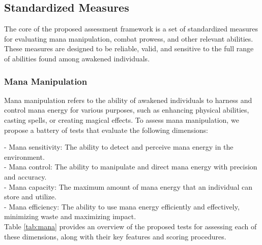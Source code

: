\documentclass[12pt, a4paper]{article}
\begin{document}
\subsection{Standardized Measures}

The core of the proposed assessment framework is a set of standardized measures for evaluating mana manipulation, combat prowess, and other relevant abilities. These measures are designed to be reliable, valid, and sensitive to the full range of abilities found among awakened individuals.

\subsubsection{Mana Manipulation}

Mana manipulation refers to the ability of awakened individuals to harness and control mana energy for various purposes, such as enhancing physical abilities, casting spells, or creating magical effects. To assess mana manipulation, we propose a battery of tests that evaluate the following dimensions:

- Mana sensitivity: The ability to detect and perceive mana energy in the environment.\\
- Mana control: The ability to manipulate and direct mana energy with precision and accuracy.\\
- Mana capacity: The maximum amount of mana energy that an individual can store and utilize. \\
- Mana efficiency: The ability to use mana energy efficiently and effectively, minimizing waste and maximizing impact.\\

Table \ref{tab:mana} provides an overview of the proposed tests for assessing each of these dimensions, along with their key features and scoring procedures.
\end{document}
